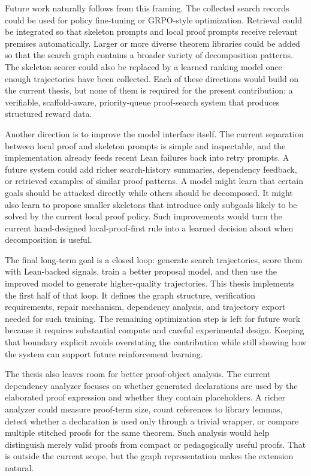 Future work naturally follows from this framing. The collected search records could be used for policy fine-tuning or GRPO-style optimization. Retrieval could be integrated so that skeleton prompts and local proof prompts receive relevant premises automatically. Larger or more diverse theorem libraries could be added so that the search graph contains a broader variety of decomposition patterns. The skeleton scorer could also be replaced by a learned ranking model once enough trajectories have been collected. Each of these directions would build on the current thesis, but none of them is required for the present contribution: a verifiable, scaffold-aware, priority-queue proof-search system that produces structured reward data.

Another direction is to improve the model interface itself. The current separation between local proof and
skeleton prompts is simple and inspectable, and the implementation already feeds recent Lean failures
back into retry prompts. A future system could add richer search-history summaries, dependency
feedback, or retrieved examples of similar proof patterns. A model
might learn that certain goals should be attacked directly while others should be decomposed. It might
also learn to propose smaller skeletons that introduce only subgoals likely to be solved by the current
local proof policy. Such improvements would turn the current hand-designed local-proof-first rule into a learned
decision about when decomposition is useful.

The final long-term goal is a closed loop: generate search trajectories, score them with Lean-backed
signals, train a better proposal model, and then use the improved model to generate higher-quality
trajectories. This thesis implements the first half of that loop. It defines the graph structure, verification
requirements, repair mechanism, dependency analysis, and trajectory export needed for such training. The
remaining optimization step is left for future work because it requires substantial compute and careful
experimental design. Keeping that boundary explicit avoids overstating the contribution while still
showing how the system can support future reinforcement learning.

The thesis also leaves room for better proof-object analysis. The current dependency analyzer focuses on
whether generated declarations are used by the elaborated proof expression and whether they contain
placeholders. A richer analyzer could measure proof-term size, count references to library lemmas, detect
whether a declaration is used only through a trivial wrapper, or compare multiple stitched proofs for the
same theorem. Such analysis would help distinguish merely valid proofs from compact or pedagogically
useful proofs. That is outside the current scope, but the graph representation makes the extension
natural.


